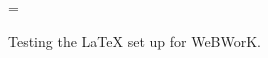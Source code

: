 \documentclass[10pt]{amsart}
\begin{document}
\voffset=-0.8in
\newpage
\setcounter{page}{1}
\begin{multicols}{2}
\columnwidth=\linewidth


Testing the LaTeX set up for WeBWorK.


\end{multicols}
\vfill
\end{document}
